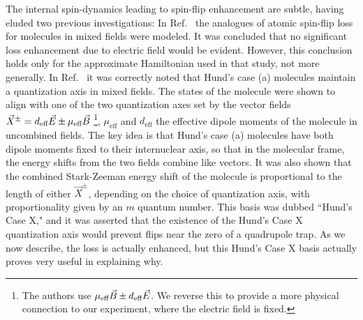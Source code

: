The internal spin-dynamics leading to spin-flip enhancement are subtle, having eluded two previous investigations:
In Ref.~\cite{Lara2008} the analogues of atomic spin-flip loss for molecules in mixed fields were modeled. 
It was concluded that no significant loss enhancement due to electric field would be evident. However, this conclusion holds only for the approximate Hamiltonian used in that study, not more generally. In Ref.~\cite{Bohn2013} it was correctly noted that Hund's case (a) molecules maintain a quantization axis in mixed fields.
The states of the molecule were shown to align with one of the two quantization axes set by the vector fields $\vec{X}^{\pm}=d_\text{eff}\vec{E} {\nobreak\hspace{.2em}} {\pm}{\nobreak\hspace{.2em}}  \mu_\text{eff}\vec{B}$
\s\footnote{The authors use $\mu_\text{eff}\vec{B} {\nobreak\hspace{.2em}} {\pm}{\nobreak\hspace{.2em}}  d_\text{eff}\vec{E}$. We reverse this to provide a more physical connection to our experiment, where the electric field is fixed.},
$\mu_\text{eff}$ and $d_\text{eff}$ the effective dipole moments of the molecule in uncombined fields.
The key idea is that Hund's case (a) molecules have both dipole moments fixed to their internuclear axis, so that in the molecular frame, the energy shifts from the two fields combine like vectors. 
It was also shown that the combined Stark-Zeeman energy shift of the molecule is proportional to the length of either $\vec{X}^{\pm}$, depending on the choice of quantization axis, with proportionality given by an $m$ quantum number.
This basis was dubbed ``Hund's Case X," and it was asserted that the existence of the Hund's Case X quantization axis would prevent flips near the zero of a quadrupole trap. 
As we now describe, the loss is actually enhanced, but this Hund's Case X basis actually proves very useful in explaining why.

